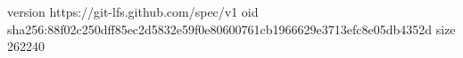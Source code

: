 version https://git-lfs.github.com/spec/v1
oid sha256:88f02c250dff85ec2d5832e59f0e80600761cb1966629e3713efc8e05db4352d
size 262240
